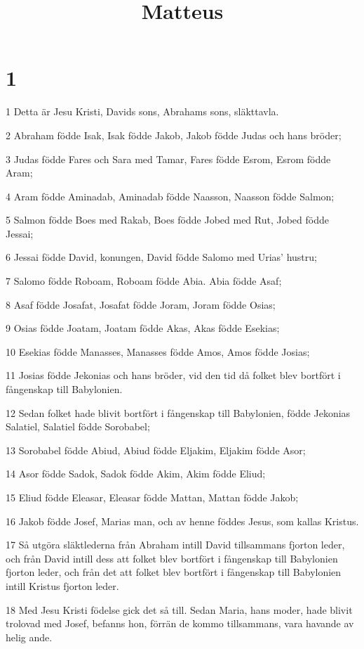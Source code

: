 

\title{Matteus}


\chapter{1}

\par 1 Detta är Jesu Kristi, Davids sons, Abrahams sons, släkttavla.
\par 2 Abraham födde Isak, Isak födde Jakob, Jakob födde Judas och hans bröder;
\par 3 Judas födde Fares och Sara med Tamar, Fares födde Esrom, Esrom födde Aram;
\par 4 Aram födde Aminadab, Aminadab födde Naasson, Naasson födde Salmon;
\par 5 Salmon födde Boes med Rakab, Boes födde Jobed med Rut, Jobed födde Jessai;
\par 6 Jessai födde David, konungen, David födde Salomo med Urias' hustru;
\par 7 Salomo födde Roboam, Roboam födde Abia. Abia födde Asaf;
\par 8 Asaf födde Josafat, Josafat födde Joram, Joram födde Osias;
\par 9 Osias födde Joatam, Joatam födde Akas, Akas födde Esekias;
\par 10 Esekias födde Manasses, Manasses födde Amos, Amos födde Josias;
\par 11 Josias födde Jekonias och hans bröder, vid den tid då folket blev bortfört i fångenskap till Babylonien.
\par 12 Sedan folket hade blivit bortfört i fångenskap till Babylonien, födde Jekonias Salatiel, Salatiel födde Sorobabel;
\par 13 Sorobabel födde Abiud, Abiud födde Eljakim, Eljakim födde Asor;
\par 14 Asor födde Sadok, Sadok födde Akim, Akim födde Eliud;
\par 15 Eliud födde Eleasar, Eleasar födde Mattan, Mattan födde Jakob;
\par 16 Jakob födde Josef, Marias man, och av henne föddes Jesus, som kallas Kristus.
\par 17 Så utgöra släktlederna från Abraham intill David tillsammans fjorton leder, och från David intill dess att folket blev bortfört i fångenskap till Babylonien fjorton leder, och från det att folket blev bortfört i fångenskap till Babylonien intill Kristus fjorton leder.
\par 18 Med Jesu Kristi födelse gick det så till. Sedan Maria, hans moder, hade blivit trolovad med Josef, befanns hon, förrän de kommo tillsammans, vara havande av helig ande.
